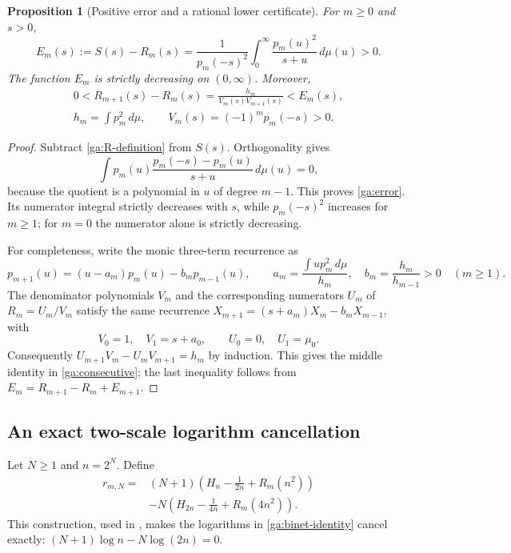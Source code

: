\documentclass[11pt,a4paper]{article}
\numberwithin{equation}{section}
\newtheorem{proposition}[theorem]{Proposition}
\theoremstyle{definition}
\theoremstyle{remark}
\begin{document}
\begin{proposition}[Positive error and a rational lower certificate]
\label{ga:positive-error}
For $m\ge0$ and $s>0$,
\begin{equation}\label{ga:error}
 E_m(s):=S(s)-R_m(s)
 =\frac1{p_m(-s)^2}
       \int_0^\infty\frac{p_m(u)^2}{s+u}\,d\mu(u)>0.
\end{equation}
The function $E_m$ is strictly decreasing on $(0,\infty)$.  Moreover,
\begin{equation}\label{ga:consecutive}
 \begin{gathered}
 0<R_{m+1}(s)-R_m(s)
 =\frac{h_m}{V_m(s)V_{m+1}(s)}<E_m(s),\\
 h_m=\int p_m^2\,d\mu,\qquad V_m(s)=(-1)^mp_m(-s)>0.
 \end{gathered}
\end{equation}
\end{proposition}
\begin{proof}
Subtract \eqref{ga:R-definition} from $S(s)$.  Orthogonality gives
\[
 \int p_m(u)
       \frac{p_m(-s)-p_m(u)}{s+u}\,d\mu(u)=0,
\]
because the quotient is a polynomial in $u$ of degree $m-1$.
This proves \eqref{ga:error}.  Its numerator integral strictly
decreases with $s$, while $p_m(-s)^2$ increases for $m\ge1$;
for $m=0$ the numerator alone is strictly decreasing.

For completeness, write the monic three-term recurrence as
\[
 p_{m+1}(u)=(u-a_m)p_m(u)-b_mp_{m-1}(u),\qquad
 a_m=\frac{\int up_m^2\,d\mu}{h_m},\quad
 b_m=\frac{h_m}{h_{m-1}}>0\quad(m\ge1).
\]
The denominator polynomials $V_m$ and the corresponding numerators
$U_m$ of $R_m=U_m/V_m$ satisfy the same recurrence
$X_{m+1}=(s+a_m)X_m-b_mX_{m-1}$, with
\[
 V_0=1,\quad V_1=s+a_0,\qquad U_0=0,\quad U_1=\mu_0.
\]
Consequently
$U_{m+1}V_m-U_mV_{m+1}=h_m$ by induction.  This gives the
middle identity in \eqref{ga:consecutive}; the last inequality follows
from $E_m=R_{m+1}-R_m+E_{m+1}$.
\end{proof}

\subsection{An exact two-scale logarithm cancellation}
\label{ga:two-scale}

Let $N\ge1$ and $n=2^N$.  Define
\begin{equation}\label{ga:r}
\begin{split}
 r_{m,N}={}&(N+1)
   \left(H_n-\frac1{2n}+R_m(n^2)\right)\\
 &-N\left(H_{2n}-\frac1{4n}+R_m(4n^2)\right).
\end{split}
\end{equation}
This construction, used in \cite{VMRC019}, makes the logarithms in
\eqref{ga:binet-identity} cancel exactly:
$(N+1)\log n-N\log(2n)=0$.
\end{document}
